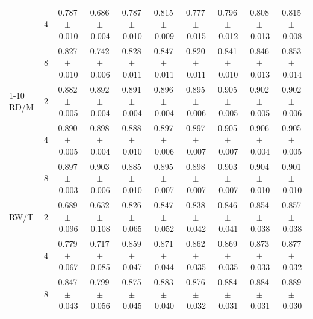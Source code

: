 \begin{tabular}{@{}lc cccc cccc@{}}
 & 4 & 0.787\,{\scriptsize$\pm$\,0.010} & 0.686\,{\scriptsize$\pm$\,0.004} & 0.787\,{\scriptsize$\pm$\,0.010} & 0.815\,{\scriptsize$\pm$\,0.009} & 0.777\,{\scriptsize$\pm$\,0.015} & 0.796\,{\scriptsize$\pm$\,0.012} & 0.808\,{\scriptsize$\pm$\,0.013} & 0.815\,{\scriptsize$\pm$\,0.008} \\
 & 8 & 0.827\,{\scriptsize$\pm$\,0.010} & 0.742\,{\scriptsize$\pm$\,0.006} & 0.828\,{\scriptsize$\pm$\,0.011} & 0.847\,{\scriptsize$\pm$\,0.011} & 0.820\,{\scriptsize$\pm$\,0.011} & 0.841\,{\scriptsize$\pm$\,0.010} & 0.846\,{\scriptsize$\pm$\,0.013} & 0.853\,{\scriptsize$\pm$\,0.014} \\
\cmidrule(l){1-10}
RD/M & 2 & 0.882\,{\scriptsize$\pm$\,0.005} & 0.892\,{\scriptsize$\pm$\,0.004} & 0.891\,{\scriptsize$\pm$\,0.004} & 0.896\,{\scriptsize$\pm$\,0.004} & 0.895\,{\scriptsize$\pm$\,0.006} & 0.905\,{\scriptsize$\pm$\,0.005} & 0.902\,{\scriptsize$\pm$\,0.005} & 0.902\,{\scriptsize$\pm$\,0.006} \\
 & 4 & 0.890\,{\scriptsize$\pm$\,0.005} & 0.898\,{\scriptsize$\pm$\,0.004} & 0.888\,{\scriptsize$\pm$\,0.010} & 0.897\,{\scriptsize$\pm$\,0.006} & 0.897\,{\scriptsize$\pm$\,0.007} & 0.905\,{\scriptsize$\pm$\,0.007} & 0.906\,{\scriptsize$\pm$\,0.004} & 0.905\,{\scriptsize$\pm$\,0.005} \\
 & 8 & 0.897\,{\scriptsize$\pm$\,0.003} & 0.903\,{\scriptsize$\pm$\,0.006} & 0.885\,{\scriptsize$\pm$\,0.010} & 0.895\,{\scriptsize$\pm$\,0.007} & 0.898\,{\scriptsize$\pm$\,0.007} & 0.903\,{\scriptsize$\pm$\,0.007} & 0.904\,{\scriptsize$\pm$\,0.010} & 0.901\,{\scriptsize$\pm$\,0.010} \\
\midrule
RW/T & 2 & 0.689\,{\scriptsize$\pm$\,0.096} & 0.632\,{\scriptsize$\pm$\,0.108} & 0.826\,{\scriptsize$\pm$\,0.065} & 0.847\,{\scriptsize$\pm$\,0.052} & 0.838\,{\scriptsize$\pm$\,0.042} & 0.846\,{\scriptsize$\pm$\,0.041} & 0.854\,{\scriptsize$\pm$\,0.038} & 0.857\,{\scriptsize$\pm$\,0.038} \\
 & 4 & 0.779\,{\scriptsize$\pm$\,0.067} & 0.717\,{\scriptsize$\pm$\,0.085} & 0.859\,{\scriptsize$\pm$\,0.047} & 0.871\,{\scriptsize$\pm$\,0.044} & 0.862\,{\scriptsize$\pm$\,0.035} & 0.869\,{\scriptsize$\pm$\,0.035} & 0.873\,{\scriptsize$\pm$\,0.033} & 0.877\,{\scriptsize$\pm$\,0.032} \\
 & 8 & 0.847\,{\scriptsize$\pm$\,0.043} & 0.799\,{\scriptsize$\pm$\,0.056} & 0.875\,{\scriptsize$\pm$\,0.045} & 0.883\,{\scriptsize$\pm$\,0.040} & 0.876\,{\scriptsize$\pm$\,0.032} & 0.884\,{\scriptsize$\pm$\,0.031} & 0.884\,{\scriptsize$\pm$\,0.031} & 0.889\,{\scriptsize$\pm$\,0.030} \\

\end{tabular}
